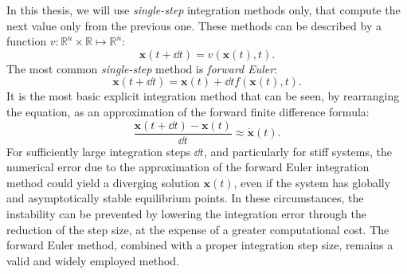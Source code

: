 In this thesis, we will use \emph{single-step} integration methods only, that compute the next value only from the previous one.
These methods can be described by a function $v: \mathbb{R}^n \times \mathbb{R} \mapsto \mathbb{R}^n$:
%
\begin{equation*}
    \mathbf{x}(t + \dd{t}) = v\left(\mathbf{x}(t), t\right) .
\end{equation*}
%
The most common \emph{single-step} method is \emph{forward Euler}:
%
\begin{equation*}
    \mathbf{x}(t + \dd{t}) = \mathbf{x}(t) + \dd{t} f\left(\mathbf{x}(t), t\right)
    .
\end{equation*}
%
It is the most basic explicit integration method that can be seen, by rearranging the equation, as an approximation of the forward finite difference formula:
%
\begin{equation*}
    \frac{\mathbf{x}(t + \dd{t}) - \mathbf{x}(t)}{\dd{t}} \approx \dot{\mathbf{x}}(t)
    .
\end{equation*}
%
For sufficiently large integration steps $\dd{t}$, and particularly for stiff systems, the numerical error due to the approximation of the forward Euler integration method could yield a diverging solution $\mathbf{x}(t)$, even if the system has globally and asymptotically stable equilibrium points.
In these circumstances, the instability can be prevented by lowering the integration error through the reduction of the step size, at the expense of a greater computational cost.
The forward Euler method, combined with a proper integration step size, remains a valid and widely employed method.

